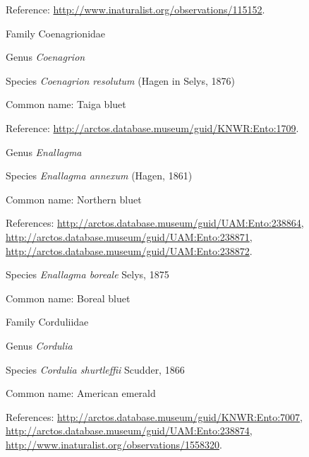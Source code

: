 \documentclass[9pt, article]{memoir}
\begin{document}
\begin{multicols}{2}
Reference: 
\url{http://www.inaturalist.org/observations/115152}.

\vspace{6pt}\noindent\hspace{24pt}Family Coenagrionidae


\vspace{6pt}\noindent\hspace{30pt}Genus \textit{Coenagrion}


\vspace{6pt}\noindent\hspace{36pt}Species \textit{Coenagrion resolutum} (Hagen in Selys, 1876)


Common name: Taiga bluet

Reference: 
\url{http://arctos.database.museum/guid/KNWR:Ento:1709}.

\vspace{6pt}\noindent\hspace{30pt}Genus \textit{Enallagma}


\vspace{6pt}\noindent\hspace{36pt}Species \textit{Enallagma annexum} (Hagen, 1861)


Common name: Northern bluet

References: 
\url{http://arctos.database.museum/guid/UAM:Ento:238864}, 
\url{http://arctos.database.museum/guid/UAM:Ento:238871}, 
\url{http://arctos.database.museum/guid/UAM:Ento:238872}.

\vspace{6pt}\noindent\hspace{36pt}Species \textit{Enallagma boreale} Selys, 1875


Common name: Boreal bluet

\vspace{6pt}\noindent\hspace{24pt}Family Corduliidae


\vspace{6pt}\noindent\hspace{30pt}Genus \textit{Cordulia}


\vspace{6pt}\noindent\hspace{36pt}Species \textit{Cordulia shurtleffii} Scudder, 1866


Common name: American emerald

References: 
\url{http://arctos.database.museum/guid/KNWR:Ento:7007}, 
\url{http://arctos.database.museum/guid/UAM:Ento:238874}, 
\url{http://www.inaturalist.org/observations/1558320}.


\end{multicols}
\end{document}
